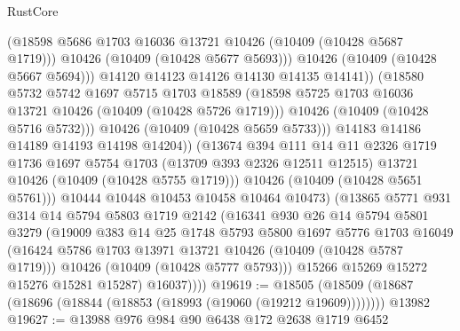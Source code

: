\begin{lexlean}{RustCore}
\begin{coremodule}
                            (@18598 @5686 @1703 @16036 @13721 @10426 (@10409 (@10428 @5687 @1719)))
                            @10426
                            (@10409 (@10428 @5677 @5693)))
                          @10426
                          (@10409 (@10428 @5667 @5694)))
                        @14120
                        @14123
                        @14126
                        @14130
                        @14135
                        @14141))
                    (@18580
                      @5732
                      @5742
                      @1697
                      @5715
                      @1703
                      @18589
                      (@18598 @5725 @1703 @16036 @13721 @10426 (@10409 (@10428 @5726 @1719)))
                      @10426
                      (@10409 (@10428 @5716 @5732)))
                    @10426
                    (@10409 (@10428 @5659 @5733)))
                  @14183
                  @14186
                  @14189
                  @14193
                  @14198
                  @14204))
              (@13674
                @394
                @111
                @14
                @11
                @2326
                @1719
                @1736
                @1697
                @5754
                @1703
                (@13709 @393 @2326 @12511 @12515)
                @13721
                @10426
                (@10409 (@10428 @5755 @1719)))
              @10426
              (@10409 (@10428 @5651 @5761)))
            @10444
            @10448
            @10453
            @10458
            @10464
            @10473)
          (@13865
            @5771
            @931
            @314
            @14
            @5794
            @5803
            @1719
            @2142
            (@16341
              @930
              @26
              @14
              @5794
              @5801
              @3279
              (@19009
                @383
                @14
                @25
                @1748
                @5793
                @5800
                @1697
                @5776
                @1703
                @16049
                (@16424 @5786 @1703 @13971 @13721 @10426 (@10409 (@10428 @5787 @1719)))
                @10426
                (@10409 (@10428 @5777 @5793)))
              @15266
              @15269
              @15272
              @15276
              @15281
              @15287)
            @16037))))
@19619 := @18505
    (@18509 (@18687 (@18696 (@18844 (@18853 (@18993 (@19060 (@19212 @19609))))))))
    @13982
@19627 := @13988 @976 @984 @90 @6438 @172 @2638 @1719 @6452

\end{coremodule}
\end{lexlean}
